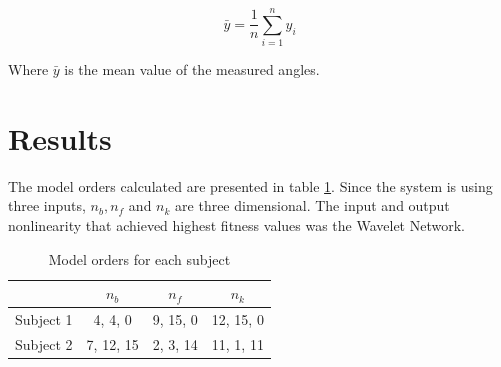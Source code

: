 \documentclass[letterpaper, 10 pt, conference]{ieeeconf}  %
\begin{document}
\begin{equation}
\label{eq:bary}
\bar{y} = \frac{1}{n} \sum_{i=1}^{n} y_i
\end{equation}

Where $\bar{y}$ is the mean value of the measured angles.












\section{Results}

The model orders calculated are presented in table \ref{ta:order}. Since the system is using three inputs, $n_b, n_f$ and $n_k$ are three dimensional. The input and output nonlinearity that achieved highest fitness values was the Wavelet Network.

\begin{table}[h]
\caption{Model orders for each subject}
\label{ta:order}
\centering
\begin{tabular}{|c|c|c|c|}
\hline
 & \(n_b\) & \(n_f\) & \(n_k\)\\
\hline \hline
Subject 1 & 4, 4, 0 & 9, 15, 0 & 12, 15, 0\\
\hline
Subject 2 & 7, 12, 15 & 2, 3, 14 & 11, 1, 11\\
\hline
\end{tabular}
\end{table}
\end{document}
